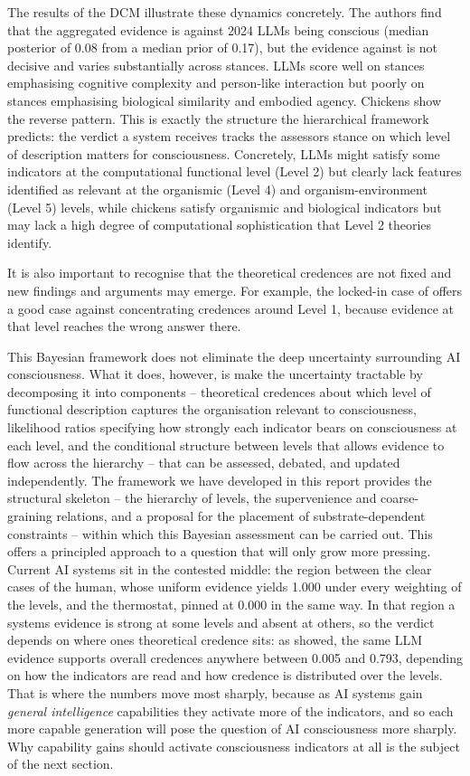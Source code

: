 \documentclass[11pt, a4paper, onecolumn, gdm]{google}
\begin{document}
The results of the DCM illustrate these dynamics concretely.
The authors find that the aggregated evidence is against 2024 LLMs being conscious (median posterior of 0.08 from a median prior of 0.17), but the evidence against is not decisive and varies substantially across stances.
LLMs score well on stances emphasising cognitive complexity and person-like interaction but poorly on stances emphasising biological similarity and embodied agency.
Chickens show the reverse pattern.
This is exactly the structure the hierarchical framework predicts: the verdict a system receives tracks the assessor\textquotesingle s stance on which level of description matters for consciousness.
Concretely, LLMs might satisfy some indicators at the computational functional level (Level 2) but clearly lack features identified as relevant at the organismic (Level 4) and organism-environment (Level 5) levels, while chickens satisfy organismic and biological indicators but may lack a high degree of computational sophistication that Level 2 theories identify.

It is also important to recognise that the theoretical credences are not fixed and new findings and arguments may emerge.
For example, the locked-in case of  offers a good case against concentrating credences around Level 1, because evidence at that level reaches the wrong answer there.

This Bayesian framework does not eliminate the deep uncertainty surrounding AI consciousness.
What it does, however, is make the uncertainty tractable by decomposing it into components -- theoretical credences about which level of functional description captures the organisation relevant to consciousness, likelihood ratios specifying how strongly each indicator bears on consciousness at each level, and the conditional structure between levels that allows evidence to flow across the hierarchy -- that can be assessed, debated, and updated independently.
The framework we have developed in this report provides the structural skeleton -- the hierarchy of levels, the supervenience and coarse-graining relations, and a proposal for the placement of substrate-dependent constraints -- within which this Bayesian assessment can be carried out.
This offers a principled approach to a question that will only grow more pressing.
Current AI systems sit in the contested middle: the region between the clear cases of the human, whose uniform evidence yields 1.000 under every weighting of the levels, and the thermostat, pinned at 0.000 in the same way.
In that region a system\textquotesingle s evidence is strong at some levels and absent at others, so the verdict depends on where one\textquotesingle s theoretical credence sits: as  showed, the same LLM evidence supports overall credences anywhere between 0.005 and 0.793, depending on how the indicators are read and how credence is distributed over the levels.
That is where the numbers move most sharply, because as AI systems gain \emph{general intelligence} capabilities they activate more of the indicators, and so each more capable generation will pose the question of AI consciousness more sharply.
Why capability gains should activate consciousness indicators at all is the subject of the next section.
\end{document}
